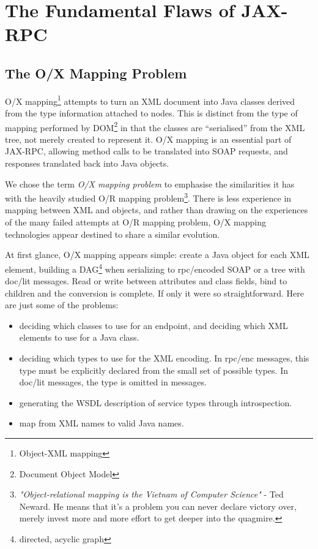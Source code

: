 \section{The Fundamental Flaws of JAX-RPC}
\label{objections:top}

\subsection{The O/X Mapping Problem}
\label{objections:o-x}

O/X mapping\footnote{Object-XML mapping} attempts to turn an XML
document into Java classes derived from the type information attached
to nodes. This is distinct from the type of mapping performed by
DOM\footnote{Document Object Model} in that the classes are
``serialised'' from the XML tree, not merely created to represent it. 
O/X mapping is an essential part of JAX-RPC, allowing method calls to
be translated into SOAP requests, and responses translated back into
Java objects.

We chose the term \emph{O/X mapping problem} to emphasise the
similarities it has with the heavily studied O/R mapping
problem\footnote{ \emph{"Object-relational mapping is the Vietnam of
Computer Science"} - Ted Neward. He means that it's a problem you can
never declare victory over, merely invest more and more effort to get
deeper into the quagmire.
}.  There is less experience in mapping between XML and objects, and
rather than drawing on the experiences of the many failed attempts at
O/R mapping problem, O/X mapping technologies appear destined to share
a similar evolution.

At first glance, O/X mapping appears simple: create a Java object
for each XML element, building a DAG\footnote{directed, acyclic graph}
when serializing to rpc/encoded SOAP or a tree with doc/lit
messages. Read or write between attributes and class fields, bind to
children and the conversion is complete. If only it were so
straightforward. Here are just some of the problems:


\begin{itemize}

\item deciding which classes to use for an endpoint, and
deciding which XML elements to use for a Java class. 

\item deciding which types to use for the XML encoding. In rpc/enc messages,
this type must be explicitly declared from the small set of possible types. In
doc/lit messages, the type is omitted in messages. 

\item generating the WSDL description of service types through introspection.

\item map from XML names to valid Java names.

\end{itemize}

